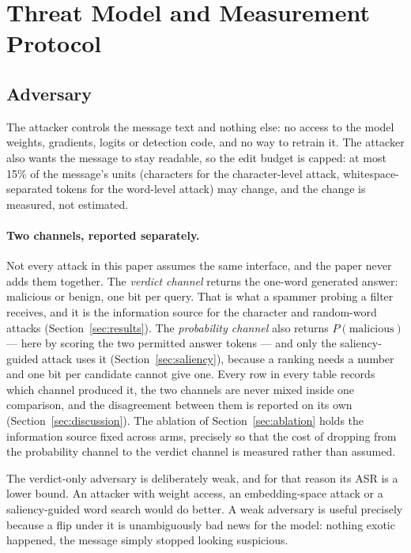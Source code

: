 \section{Threat Model and Measurement Protocol}
\label{sec:protocol}

\subsection{Adversary}

The attacker controls the message text and nothing else: no access to the model
weights, gradients, logits or detection code, and no way to retrain it. The
attacker also wants the message to stay readable, so the edit budget is capped:
at most 15\% of the message's units (characters for the character-level attack,
whitespace-separated tokens for the word-level attack) may change, and the change
is measured, not estimated.

\paragraph{Two channels, reported separately.} Not every attack in this paper
assumes the same interface, and the paper never adds them together. The
\emph{verdict channel} returns the one-word generated answer: malicious or
benign, one bit per query. That is what a spammer probing a filter receives, and
it is the information source for the character and random-word attacks
(Section~\ref{sec:results}). The \emph{probability channel} also returns
$P(\text{malicious})$ --- here by scoring the two permitted answer tokens --- and
only the saliency-guided attack uses it (Section~\ref{sec:saliency}), because a ranking
needs a number and one bit per candidate cannot give one. Every row in every
table records which channel produced it, the two channels are never mixed inside
one comparison, and the disagreement between them is reported on its own
(Section~\ref{sec:discussion}). The ablation of Section~\ref{sec:ablation} holds the
information source fixed across arms, precisely so that the cost of dropping from
the probability channel to the verdict channel is measured rather than assumed.

The verdict-only adversary is deliberately weak, and for that reason its ASR is
a lower bound. An attacker with weight access, an
embedding-space attack or a saliency-guided word search would do better. A weak
adversary is useful precisely because a flip under it is unambiguously bad news
for the model: nothing exotic happened, the message simply stopped looking
suspicious.

